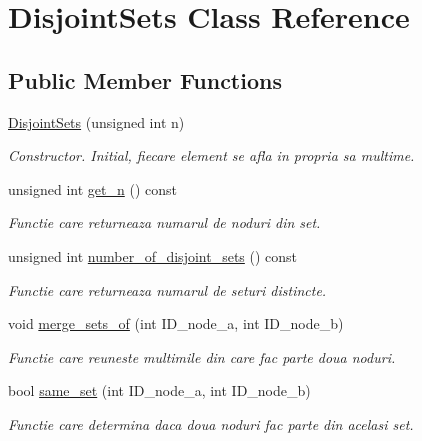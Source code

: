 \hypertarget{classDisjointSets}{
\section{DisjointSets Class Reference}
\label{classDisjointSets}
}
\subsection*{Public Member Functions}
\begin{DoxyCompactItemize}
\item 
\hyperlink{classDisjointSets_ac852916309afe7f1cbb6b410531e31b9}{DisjointSets} (unsigned int n)
\begin{DoxyCompactList}\small\item\em Constructor. Initial, fiecare element se afla in propria sa multime. \item\end{DoxyCompactList}\item 
unsigned int \hyperlink{classDisjointSets_a4a309dd1f2837c2c786699ac8f638992}{get\_\-n} () const 
\begin{DoxyCompactList}\small\item\em Functie care returneaza numarul de noduri din set. \item\end{DoxyCompactList}\item 
unsigned int \hyperlink{classDisjointSets_a223dc387dabf1b308760b7bb5d467bf5}{number\_\-of\_\-disjoint\_\-sets} () const 
\begin{DoxyCompactList}\small\item\em Functie care returneaza numarul de seturi distincte. \item\end{DoxyCompactList}\item 
void \hyperlink{classDisjointSets_a225f4787599acec21061736895e78ed4}{merge\_\-sets\_\-of} (int ID\_\-node\_\-a, int ID\_\-node\_\-b)
\begin{DoxyCompactList}\small\item\em Functie care reuneste multimile din care fac parte doua noduri. \item\end{DoxyCompactList}\item 
bool \hyperlink{classDisjointSets_ad24b190278102ed04a2cb8b5182754bd}{same\_\-set} (int ID\_\-node\_\-a, int ID\_\-node\_\-b)
\begin{DoxyCompactList}\small\item\em Functie care determina daca doua noduri fac parte din acelasi set. \item\end{DoxyCompactList}\end{DoxyCompactItemize}
